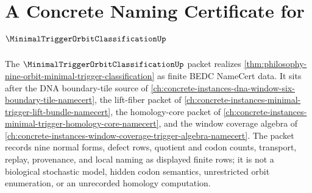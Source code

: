 \chapter{A Concrete Naming Certificate for $\MinimalTriggerOrbitClassificationUp$}
\label{ch:concrete-instances-minimal-trigger-orbit-classification-namecert}

The $\MinimalTriggerOrbitClassificationUp$ packet realizes \autoref{thm:philosophy-nine-orbit-minimal-trigger-classification} as finite BEDC NameCert data. It sits after the DNA boundary-tile source of \autoref{ch:concrete-instances-dna-window-six-boundary-tile-namecert}, the lift-fiber packet of \autoref{ch:concrete-instances-minimal-trigger-lift-bundle-namecert}, the homology-core packet of \autoref{ch:concrete-instances-minimal-trigger-homology-core-namecert}, and the window coverage algebra of \autoref{ch:concrete-instances-window-coverage-trigger-algebra-namecert}. The packet records nine normal forms, defect rows, quotient and codon counts, transport, replay, provenance, and local naming as displayed finite rows; it is not a biological stochastic model, hidden codon semantics, unrestricted orbit enumeration, or an unrecorded homology computation.

